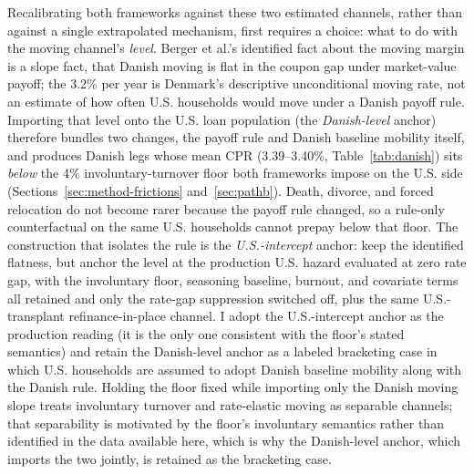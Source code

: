 \documentclass[12pt]{article}
\begin{document}
Recalibrating both frameworks against these two estimated channels, rather than against a single extrapolated mechanism, first requires a choice: what to do with the moving channel's \emph{level}. Berger et al.'s identified fact about the moving margin is a slope fact, that Danish moving is flat in the coupon gap under market-value payoff; the 3.2\% per year is Denmark's descriptive unconditional moving rate, not an estimate of how often U.S. households would move under a Danish payoff rule. Importing that level onto the U.S. loan population (the \emph{Danish-level} anchor) therefore bundles two changes, the payoff rule and Danish baseline mobility itself, and produces Danish legs whose mean CPR (3.39--3.40\%, Table~\ref{tab:danish}) sits \emph{below} the 4\% involuntary-turnover floor both frameworks impose on the U.S. side (Sections~\ref{sec:method-frictions} and~\ref{sec:pathb}). Death, divorce, and forced relocation do not become rarer because the payoff rule changed, so a rule-only counterfactual on the same U.S. households cannot prepay below that floor. The construction that isolates the rule is the \emph{U.S.-intercept} anchor: keep the identified flatness, but anchor the level at the production U.S. hazard evaluated at zero rate gap, with the involuntary floor, seasoning baseline, burnout, and covariate terms all retained and only the rate-gap suppression switched off, plus the same U.S.-transplant refinance-in-place channel. I adopt the U.S.-intercept anchor as the production reading (it is the only one consistent with the floor's stated semantics) and retain the Danish-level anchor as a labeled bracketing case in which U.S. households are assumed to adopt Danish baseline mobility along with the Danish rule. Holding the floor fixed while importing only the Danish moving slope treats involuntary turnover and rate-elastic moving as separable channels; that separability is motivated by the floor's involuntary semantics rather than identified in the data available here, which is why the Danish-level anchor, which imports the two jointly, is retained as the bracketing case.
\end{document}
